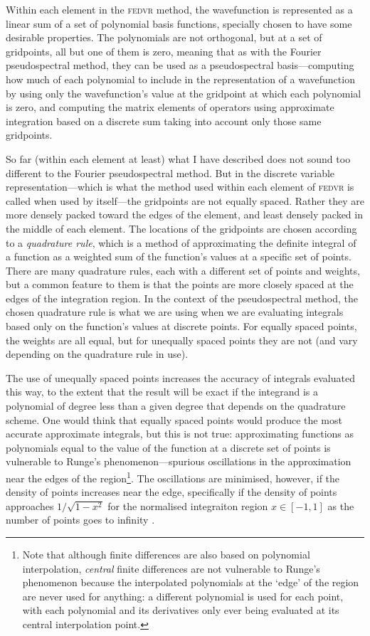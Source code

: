 Within each element in the \textsc{fedvr} method, the wavefunction is represented as a linear sum of a set of polynomial basis functions, specially chosen to have some desirable properties. The polynomials are not orthogonal, but at a set of gridpoints, all but one of them is zero, meaning that as with the Fourier pseudospectral method, they can be used as a pseudospectral basis---computing how much of each polynomial to include in the representation of a wavefunction by using only the wavefunction's value at the gridpoint at which each polynomial is zero, and computing the matrix elements of operators using approximate integration based on a discrete sum taking into account only those same gridpoints.

So far (within each element at least) what I have described does not sound too different to the Fourier pseudospectral method. But in the discrete variable representation---which is what the method used within each element of \textsc{fedvr} is called when used by itself---the gridpoints are not equally spaced. Rather they are more densely packed toward the edges of the element, and least densely packed in the middle of each element. The locations of the gridpoints are chosen according to a \emph{quadrature rule}, which is a method of approximating the definite integral of a function as a  weighted sum of the function's values at a specific set of points. There are many quadrature rules, each with a different set of points and weights, but a common feature to them is that the points are more closely spaced at the edges of the integration region. In the context of the pseudospectral method, the chosen quadrature rule is what we are using when we are evaluating integrals based only on the function's values at discrete points. For equally spaced points, the weights are all equal, but for unequally spaced points they are not (and vary depending on the quadrature rule in use).

The use of unequally spaced points increases the accuracy of integrals evaluated this way, to the extent that the result will be exact if the integrand is a polynomial of degree less than a given degree that depends on the quadrature scheme. One would think that equally spaced points would produce the most accurate approximate integrals, but this is not true: approximating functions as polynomials equal to the value of the function at a discrete set of points is vulnerable to Runge's phenomenon---spurious oscillations in the approximation near the edges of the region\footnote{Note that although finite differences are also based on polynomial interpolation, \emph{central} finite differences are not vulnerable to Runge's phenomenon because the interpolated polynomials at the `edge' of the region are never used for anything: a different polynomial is used for each point, with each polynomial and its derivatives only ever being evaluated at its central interpolation point.}. The oscillations are minimised, however, if the density of points increases near the edge, specifically if the density of points approaches $1/\sqrt{1 - x^2}$ for the normalised integraiton region $x \in [-1, 1]$ as the number of points goes to infinity \cite{berrut_barycentric_2004}. 

